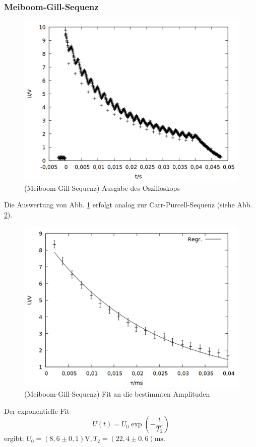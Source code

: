 \subsubsection{Meiboom-Gill-Sequenz}
\begin{figure}[h]
\centering
\includegraphics[width=0.75\linewidth]{data/p402_443_data/meiboom_gill_sequenz/plot_159.png}
\caption{(Meiboom-Gill-Sequenz) Ausgabe des Oszilloskops}
\label{fig:gill_raw}
\end{figure}
Die Auswertung von Abb. \ref{fig:gill_raw} erfolgt analog zur Carr-Purcell-Sequenz (siehe Abb. \ref{fig:gill}).
\begin{figure}[h]
\centering
\includegraphics[width=0.75\linewidth]{data/p402_443_data/meiboom_gill_sequenz/out_gill.png}
\caption{(Meiboom-Gill-Sequenz) Fit an die bestimmten Amplituden}
\label{fig:gill}
\end{figure}

Der exponentielle Fit $$U(t) = U_0\exp{\left(-\frac{t}{T_2}\right)}$$ ergibt: $U_0 = (8,6\pm 0,1)\si{\volt}, T_2 = (22,4\pm 0,6) \si{\milli\second}$.\\

